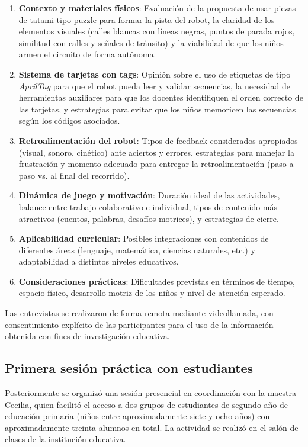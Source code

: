 \documentclass{prgrado}
\begin{document}
\begin{enumerate}
\item \textbf{Contexto y materiales físicos}: Evaluación de la propuesta de usar piezas de tatami tipo puzzle para formar la pista del robot, la claridad de los elementos visuales (calles blancas con líneas negras, puntos de parada rojos, similitud con calles y señales de tránsito) y la viabilidad de que los niños armen el circuito de forma autónoma.
\item \textbf{Sistema de tarjetas con tags}: Opinión sobre el uso de etiquetas de tipo \textit{AprilTag} para que el robot pueda leer y validar secuencias, la necesidad de herramientas auxiliares para que los docentes identifiquen el orden correcto de las tarjetas, y estrategias para evitar que los niños memoricen las secuencias según los códigos asociados.
\item \textbf{Retroalimentación del robot}: Tipos de feedback considerados apropiados (visual, sonoro, cinético) ante aciertos y errores, estrategias para manejar la frustración y momento adecuado para entregar la retroalimentación (paso a paso vs. al final del recorrido).
\item \textbf{Dinámica de juego y motivación}: Duración ideal de las actividades, balance entre trabajo colaborativo e individual, tipos de contenido más atractivos (cuentos, palabras, desafíos motrices), y estrategias de cierre.
\item \textbf{Aplicabilidad curricular}: Posibles integraciones con contenidos de diferentes áreas (lenguaje, matemática, ciencias naturales, etc.) y adaptabilidad a distintos niveles educativos.
\item \textbf{Consideraciones prácticas}: Dificultades previstas en términos de tiempo, espacio físico, desarrollo motriz de los niños y nivel de atención esperado.
\end{enumerate}

Las entrevistas se realizaron de forma remota mediante videollamada, con consentimiento explícito de las participantes para el uso de la información obtenida con fines de investigación educativa.

\subsection{Primera sesión práctica con estudiantes}
Posteriormente se organizó una sesión presencial en coordinación con la maestra Cecilia, quien facilitó el acceso a dos grupos de estudiantes de segundo año de educación primaria (niños entre aproximadamente siete y ocho años) con aproximadamente treinta alumnos en total. La actividad se realizó en el salón de clases de la institución educativa.
\end{document}
